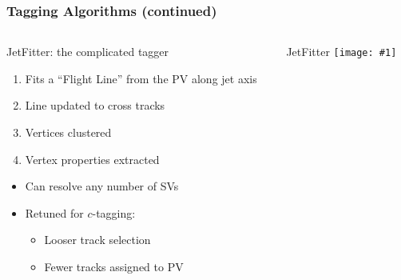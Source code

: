 \documentclass[usenames,dvipsnames]{beamer}
\newcommand{\widegraphic}[1]{\texttt{[image: \#1]}}
\begin{document}
\begin{frame}
  \frametitle{Tagging Algorithms (continued)}
  \begin{columns}
    \begin{column}{0.5\textwidth}
      JetFitter: the complicated tagger
      \begin{enumerate}
      \item Fits a ``Flight Line'' from the PV along jet axis
      \item Line updated to cross tracks
      \item Vertices clustered
      \item Vertex properties extracted
      \end{enumerate}
      \begin{itemize}
      \item Can resolve any number of SVs
      \item Retuned for $c$-tagging:
        \begin{itemize}
        \item Looser track selection
        \item Fewer tracks assigned to PV
        \end{itemize}
      \end{itemize}
    \end{column}
    \begin{column}{0.5\textwidth}
        \begin{center}
          JetFitter
      \widegraphic{figures/external/b-jet-jf.pdf}
        \end{center}
    \end{column}
  \end{columns}
\end{frame}
\end{document}
